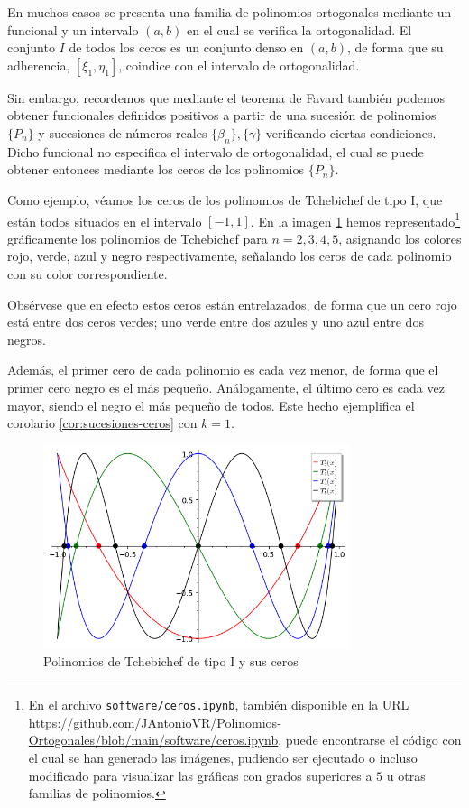 En muchos casos se presenta una familia de polinomios ortogonales mediante un funcional y un intervalo $(a,b)$ en el cual se verifica la ortogonalidad. El conjunto $I$ de todos los ceros es un conjunto denso en $(a,b)$, de forma que su adherencia, $[\xi_1,\eta_1]$, coindice con el intervalo de ortogonalidad.

Sin embargo, recordemos que mediante el teorema de Favard también podemos obtener funcionales definidos positivos a partir de una sucesión de polinomios $\{P_n\}$ y sucesiones de números reales $\{\beta_n\}, \{\gamma\}$ verificando ciertas condiciones. Dicho funcional no especifica el intervalo de ortogonalidad, el cual se puede obtener entonces mediante los ceros de los polinomios $\{P_n\}$.

\begin{ejemplo}
    Como ejemplo, véamos los ceros de los polinomios de Tchebichef de tipo I, que están todos situados en el intervalo $[-1,1]$. En la imagen \ref{img:ejemplo-ceros} hemos representado\footnote{En el archivo \texttt{software/ceros.ipynb}, también disponible en la URL \url{https://github.com/JAntonioVR/Polinomios-Ortogonales/blob/main/software/ceros.ipynb}, puede encontrarse el código con el cual se han generado las imágenes, pudiendo ser ejecutado o incluso modificado para visualizar las gráficas con grados superiores a $5$ u otras familias de polinomios.} gráficamente los polinomios de Tchebichef para $n=2,3,4,5$, asignando los colores rojo, verde, azul y negro respectivamente, señalando los ceros de cada polinomio con su color correspondiente. 

    Obsérvese que en efecto estos ceros están entrelazados, de forma que un cero rojo está entre dos ceros verdes; uno verde entre dos azules y uno azul entre dos negros.

    Además, el primer cero de cada polinomio es cada vez menor, de forma que el primer cero negro es el más pequeño. Análogamente, el último cero es cada vez mayor, siendo el negro el más pequeño de todos. Este hecho ejemplifica el corolario \ref{cor:sucesiones-ceros} con $k=1$.
    
    \begin{figure}[h]
        \centering
        \includegraphics[width=9cm]{img/C1/ceros.png}
        \caption{Polinomios de Tchebichef de tipo I y sus ceros}
        \label{img:ejemplo-ceros}
    \end{figure}

    
\end{ejemplo}

